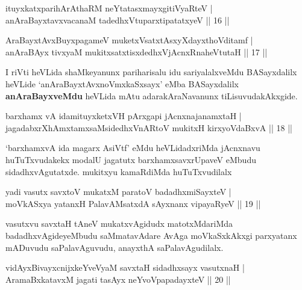 
\begin{shl}
ituyxkatxparihArAthaRM neYtatasxmayxgitiVyaRteV |\\
anAraBayxtavxvacanaM tadedhxVtuparxtipatatxyeV \hfill || 16 ||
\end{shl}
\begin{shl}
AraBayxtAvxBuyxpagameV muketxVsatxtAsxyXdayxthoVditamf |\\
anAraBAyx tivxyaM mukitxsatxtisxdedhxVjAcnxRnaheVtutaH \hfill || 17 ||
\end{shl}

\begin{artha}
I riVti heVLida shaMkeyanunx pariharisalu idu sariyalalxveMdu BASayxdalilx heVLide `anAraBayxtAvxnoVmxkaSxsayx' eMba BASayxdalilx \textbf{anAraBayxveMdu} heVLida mAtu adarakAraNavanunx tiLisuvudakAkxgide.
\end{artha}

\begin{shl}
barxhamx vA idamituyxketxVH pArxgapi jAcnxnajanamxtaH |\\
jagadabxrXhAmxtamxsaMsidedhxVnARtoV mukitxH kirxyoVdaBxvA \hfill || 18 ||
\end{shl}

\begin{artha}
`barxhamxvA ida magarx AsiVtf' eMdu heVLidadxriMda jAcnxnavu huTuTxvudakekx modalU jagatutx barxhamxsavxrUpaveV eMbudu sidadhxvAgutatxde. mukitxyu kamaRdiMda huTuTxvudilalx
\end{artha}

\begin{shl}
yadi vasutx savxtoV mukatxM paratoV badadhxmiSayxteV |\\
moVkASxya yatanxH PalavAMsatxdA sAyxnanx vipayaRyeV \hfill || 19 ||
\end{shl}

\begin{artha}
vasutxvu savxtaH tAneV mukatxvAgidudx matotxMdariMda badadhxvAgideyeMbudu saMmatavAdare AvAga moVkaSxkAkxgi parxyatanx mADuvudu saPalavAguvudu, anayxthA saPalavAgudilalx.
\end{artha}


\begin{shl}
vidAyx\s BivayxcnijxkeYveVyaM savxtaH sidadhxsayx vasutxnaH |\\
AramaBxkatavxM jagati tasAyx neYvoVpapadayxteV \hfill || 20 ||
\end{shl}

